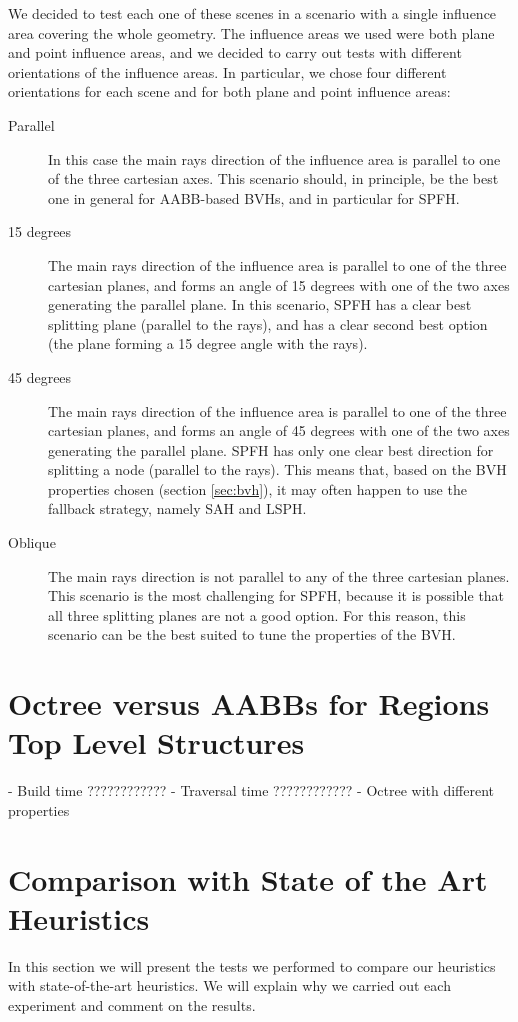 \documentclass{PoliMi_MasterThesis}
\begin{document}
We decided to test each one of these scenes in a scenario with a single influence area covering the whole geometry. The influence areas we used were both plane and point influence areas, and we decided to carry out tests with different orientations of the influence areas. In particular, we chose four different orientations for each scene and for both plane and point influence areas:
\begin{description}
	\item[Parallel] In this case the main rays direction of the influence area is parallel to one of the three cartesian axes. This scenario should, in principle, be the best one in general for AABB-based BVHs, and in particular for SPFH.
	\item[15 degrees] The main rays direction of the influence area is parallel to one of the three cartesian planes, and forms an angle of 15 degrees with one of the two axes generating the parallel plane. In this scenario, SPFH has a clear best splitting plane (parallel to the rays), and has a clear second best option (the plane forming a 15 degree angle with the rays).
	\item[45 degrees] The main rays direction of the influence area is parallel to one of the three cartesian planes, and forms an angle of 45 degrees with one of the two axes generating the parallel plane. SPFH has only one clear best direction for splitting a node (parallel to the rays). This means that, based on the BVH properties chosen (section \ref{sec:bvh}), it may often happen to use the fallback strategy, namely SAH and LSPH.
	\item[Oblique] The main rays direction is not parallel to any of the three cartesian planes. This scenario is the most challenging for SPFH, because it is possible that all three splitting planes are not a good option. For this reason, this scenario can be the best suited to tune the properties of the BVH.
\end{description}

\section{Octree versus AABBs for Regions Top Level Structures}
- Build time ????????????
- Traversal time ????????????
- Octree with different properties

\section{Comparison with State of the Art Heuristics}
In this section we will present the tests we performed to compare our heuristics with state-of-the-art heuristics. We will explain why we carried out each experiment and comment on the results.
\end{document}

